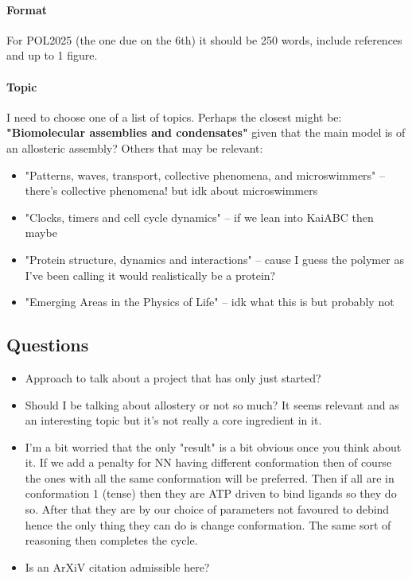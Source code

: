 \documentclass[11pt]{article}
\begin{document}
\paragraph{Format}
For POL2025 (the one due on the 6th) it should be 250 words, include references and up to 1 figure.
\paragraph{Topic}
I need to choose one of a list of topics.
Perhaps the closest might be: \textbf{"Biomolecular assemblies and condensates"} given that the main model is of an allosteric assembly?
Others that may be relevant:
\begin{itemize}
	\item "Patterns, waves, transport, collective phenomena, and microswimmers" -- there's collective phenomena! but idk about microswimmers
	\item "Clocks, timers and cell cycle dynamics" -- if we lean into KaiABC then maybe
	\item "Protein structure, dynamics and interactions" -- cause I guess the polymer as I've been calling it would realistically be a protein?
	\item "Emerging Areas in the Physics of Life" -- idk what this is but probably not
\end{itemize}

\subsection{Questions}
\begin{itemize}
	\item Approach to talk about a project that has only just started?
	\item Should I be talking about allostery or not so much? It seems relevant and as an interesting topic but it's not really a core ingredient in it.
	\item I'm a bit worried that the only "result" is a bit obvious once you think about it. If we add a penalty for NN having different conformation then of course the ones with all the same conformation will be preferred. Then if all are in conformation 1 (tense) then they are ATP driven to bind ligands so they do so. After that they are by our choice of parameters not favoured to debind hence the only thing they can do is change conformation. The same sort of reasoning then completes the cycle.
	\item Is an ArXiV citation admissible here?
\end{itemize}
\end{document}
